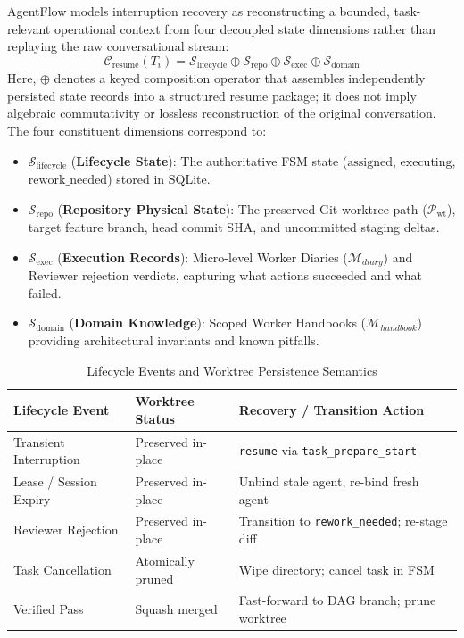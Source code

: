 \documentclass[conference]{IEEEtran}
\begin{document}
AgentFlow models interruption recovery as reconstructing a bounded, task-relevant operational context from four decoupled state dimensions rather than replaying the raw conversational stream:
\begin{equation}
\mathcal{C}_{\text{resume}}(T_i) = \mathcal{S}_{\text{lifecycle}} \oplus \mathcal{S}_{\text{repo}} \oplus \mathcal{S}_{\text{exec}} \oplus \mathcal{S}_{\text{domain}}
\end{equation}
Here, $\oplus$ denotes a keyed composition operator that assembles independently persisted state records into a structured resume package; it does not imply algebraic commutativity or lossless reconstruction of the original conversation. The four constituent dimensions correspond to:
\begin{itemize}
    \item $\mathcal{S}_{\text{lifecycle}}$ (\textbf{Lifecycle State}): The authoritative FSM state ($\text{assigned}$, $\text{executing}$, $\text{rework\_needed}$) stored in SQLite.
    \item $\mathcal{S}_{\text{repo}}$ (\textbf{Repository Physical State}): The preserved Git worktree path ($\mathcal{P}_{\text{wt}}$), target feature branch, head commit SHA, and uncommitted staging deltas.
    \item $\mathcal{S}_{\text{exec}}$ (\textbf{Execution Records}): Micro-level Worker Diaries ($\mathcal{M}_{diary}$) and Reviewer rejection verdicts, capturing what actions succeeded and what failed.
    \item $\mathcal{S}_{\text{domain}}$ (\textbf{Domain Knowledge}): Scoped Worker Handbooks ($\mathcal{M}_{handbook}$) providing architectural invariants and known pitfalls.
\end{itemize}

\begin{table}[t]
\centering
\caption{Lifecycle Events and Worktree Persistence Semantics}
\label{tab:worktree_lifecycle_semantics}
\begin{tabularx}{\columnwidth}{lXX}
\toprule
\textbf{Lifecycle Event} & \textbf{Worktree Status} & \textbf{Recovery / Transition Action} \\
\midrule
Transient Interruption & Preserved in-place & \texttt{resume} via \texttt{task\_prepare\_start} \\
Lease / Session Expiry & Preserved in-place & Unbind stale agent, re-bind fresh agent \\
Reviewer Rejection & Preserved in-place & Transition to \texttt{rework\_needed}; re-stage diff \\
Task Cancellation & Atomically pruned & Wipe directory; cancel task in FSM \\
Verified Pass & Squash merged & Fast-forward to DAG branch; prune worktree \\
\bottomrule
\end{tabularx}
\end{table}
\end{document}
